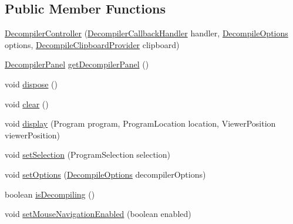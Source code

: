\subsection*{Public Member Functions}
\begin{DoxyCompactItemize}
\item 
\mbox{\hyperlink{classghidra_1_1app_1_1decompiler_1_1component_1_1_decompiler_controller_a9e275629c64dc9e5a0672069c97b7d9f}{Decompiler\+Controller}} (\mbox{\hyperlink{interfaceghidra_1_1app_1_1decompiler_1_1component_1_1_decompiler_callback_handler}{Decompiler\+Callback\+Handler}} handler, \mbox{\hyperlink{classghidra_1_1app_1_1decompiler_1_1_decompile_options}{Decompile\+Options}} options, \mbox{\hyperlink{classghidra_1_1app_1_1plugin_1_1core_1_1decompile_1_1_decompile_clipboard_provider}{Decompile\+Clipboard\+Provider}} clipboard)
\item 
\mbox{\hyperlink{classghidra_1_1app_1_1decompiler_1_1component_1_1_decompiler_panel}{Decompiler\+Panel}} \mbox{\hyperlink{classghidra_1_1app_1_1decompiler_1_1component_1_1_decompiler_controller_aa8f29129756996d82bba639e741296bb}{get\+Decompiler\+Panel}} ()
\item 
void \mbox{\hyperlink{classghidra_1_1app_1_1decompiler_1_1component_1_1_decompiler_controller_a630ed5b31dfc58f308580a98ca63fc65}{dispose}} ()
\item 
void \mbox{\hyperlink{classghidra_1_1app_1_1decompiler_1_1component_1_1_decompiler_controller_af8cd025cdb201c8b5e14f52a4357a65d}{clear}} ()
\item 
void \mbox{\hyperlink{classghidra_1_1app_1_1decompiler_1_1component_1_1_decompiler_controller_a1fe6c6e0f0652b4ae240ec90a9214612}{display}} (Program program, Program\+Location location, Viewer\+Position viewer\+Position)
\item 
void \mbox{\hyperlink{classghidra_1_1app_1_1decompiler_1_1component_1_1_decompiler_controller_ab8b004d5f993e1514406f07c0878794e}{set\+Selection}} (Program\+Selection selection)
\item 
void \mbox{\hyperlink{classghidra_1_1app_1_1decompiler_1_1component_1_1_decompiler_controller_aaf14081587bb40519aafb382238d5a5d}{set\+Options}} (\mbox{\hyperlink{classghidra_1_1app_1_1decompiler_1_1_decompile_options}{Decompile\+Options}} decompiler\+Options)
\item 
boolean \mbox{\hyperlink{classghidra_1_1app_1_1decompiler_1_1component_1_1_decompiler_controller_a32d5c19b45f461f61f98f076ac043c63}{is\+Decompiling}} ()
\item 
void \mbox{\hyperlink{classghidra_1_1app_1_1decompiler_1_1component_1_1_decompiler_controller_a2c2f9e954a06f788a8571cf836f89f46}{set\+Mouse\+Navigation\+Enabled}} (boolean enabled)

\end{DoxyCompactItemize}
